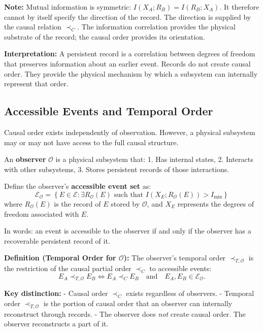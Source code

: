 \documentclass[12pt, a4paper]{article}
\begin{document}
\textbf{Note:} Mutual information is symmetric: \( I(X_A; R_B) = I(R_B; X_A) \). It therefore cannot by itself specify the direction of the record. The direction is supplied by the causal relation \( \prec_C \). The information correlation provides the physical substrate of the record; the causal order provides its orientation.

\textbf{Interpretation:} A persistent record is a correlation between degrees of freedom that preserves information about an earlier event. Records do not create causal order. They provide the physical mechanism by which a subsystem can internally represent that order.

\subsection{Accessible Events and Temporal Order}

Causal order exists independently of observation. However, a physical subsystem may or may not have access to the full causal structure.

An \textbf{observer} \( \mathcal{O} \) is a physical subsystem that:
1. Has internal states,
2. Interacts with other subsystems,
3. Stores persistent records of those interactions.

Define the observer's \textbf{accessible event set} as:
\[
\mathcal{E}_{\mathcal{O}}
=
\left\{
E\in\mathcal{E}:
\exists R_{\mathcal O}(E)
\text{ such that }
I(X_E;R_{\mathcal O}(E))>I_{\min}
\right\}
\]
where \( R_{\mathcal O}(E) \) is the record of \( E \) stored by \( \mathcal O \), and \( X_E \) represents the degrees of freedom associated with \( E \).

In words: an event is accessible to the observer if and only if the observer has a recoverable persistent record of it.

\textbf{Definition (Temporal Order for \( \mathcal{O} \)):} The observer's temporal order \( \prec_{T,\mathcal{O}} \) is the restriction of the causal partial order \( \prec_C \) to accessible events:
\[
E_A \prec_{T,\mathcal{O}} E_B
\iff
E_A \prec_C E_B
\quad\text{and}\quad
E_A, E_B \in \mathcal{E}_{\mathcal{O}}.
\]

\textbf{Key distinction:}
- Causal order \( \prec_C \) exists regardless of observers.
- Temporal order \( \prec_{T,\mathcal{O}} \) is the portion of causal order that an observer can internally reconstruct through records.
- The observer does \textit{not} create causal order. The observer reconstructs a part of it.
\end{document}
